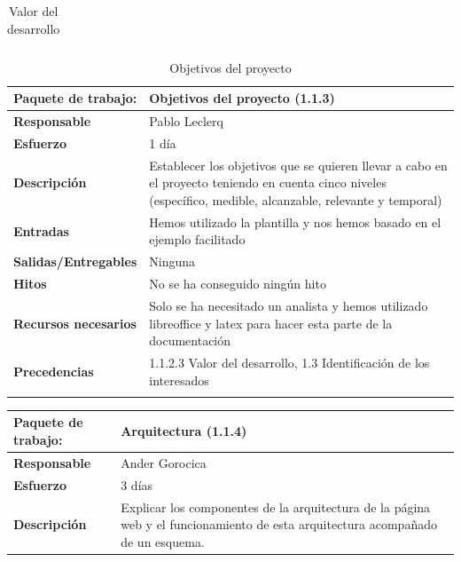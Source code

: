 \documentclass{report}
\begin{document}
\begin{center}
\begin{longtable}{|p{6cm}|p{6cm}|}
                    \caption{Valor del desarrollo}
                \end{longtable}
                \clearpage
                \begin{longtable}{|p{6cm}|p{6cm}|}
                    \hline
                    \textbf{Paquete de trabajo:} & Objetivos del proyecto (1.1.3)\\
                    \hline
                    \textbf{Responsable} & Pablo Leclerq\\
                    \hline
                    \textbf{Esfuerzo} & 1 día\\
                    \hline
                    \textbf{Descripción} & Establecer los objetivos que se quieren llevar a cabo en el proyecto teniendo en cuenta cinco niveles (específico, medible, alcanzable, relevante y temporal)\\
                    \hline
                    \textbf{Entradas} & Hemos utilizado la plantilla y nos hemos basado en el ejemplo facilitado\\
                    \hline
                    \textbf{Salidas/Entregables} & Ninguna\\
                    \hline
                    \textbf{Hitos} & No se ha conseguido ningún hito\\
                    \hline
                    \textbf{Recursos necesarios} & Solo se ha necesitado un analista y hemos utilizado libreoffice y latex para hacer esta parte de la documentación\\
                    \hline
                    \textbf{Precedencias} & 1.1.2.3 Valor del desarrollo,
                                            1.3 Identificación de los interesados\\
                    \hline
                    \caption{Objetivos del proyecto}
                \end{longtable}
                \begin{longtable}{|p{6cm}|p{6cm}|}
                    \hline
                    \textbf{Paquete de trabajo:} & Arquitectura (1.1.4)\\
                    \hline
                    \textbf{Responsable} & Ander Gorocica\\
                    \hline
                    \textbf{Esfuerzo} & 3 días\\
                    \hline
                    \textbf{Descripción} & Explicar los componentes de la arquitectura de la página web y el funcionamiento de esta arquitectura acompañado de un esquema.\\

\end{longtable}
\end{center}
\end{document}
